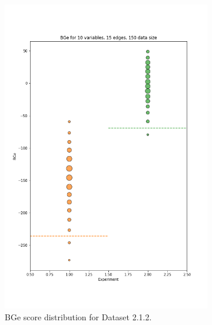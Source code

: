 \documentclass{lxaiproposal}
\begin{document}
\begin{figure}[h]
\begin{subfigure}{0.32\textwidth}
            \includegraphics[width=\textwidth]{figures/BGe_10_15_150}
            \caption{BGe score distribution for Dataset 2.1.2.}
            \label{fig:bge_score_10_15_150}
        \end{subfigure}
        \begin{subfigure}{0.32\textwidth}
            \centering

\end{subfigure}
\end{figure}
\end{document}
